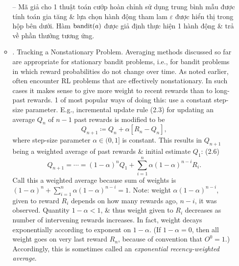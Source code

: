 \documentclass{article}
\begin{document}
\begin{itemize}
\begin{itemize}
        -- Mã giả cho 1 thuật toán cướp hoàn chỉnh sử dụng trung bình mẫu được tính toán gia tăng \& lựa chọn hành động tham lam $\varepsilon$ được hiển thị trong hộp bên dưới. Hàm ${\rm bandit}(a)$ được giả định thực hiện 1 hành động \& trả về phần thưởng tương ứng.
        \item {. Tracking a Nonstationary Problem.} Averaging methods discussed so far are appropriate for stationary bandit problems, i.e., for bandit problems in which reward probabilities do not change over time. As noted earlier, often encounter RL problems that are effectively nonstationary. In such cases it makes sense to give more weight to recent rewards than to long-past rewards. 1 of most popular ways of doing this: use a constant step-size parameter. E.g., incremental update rule (2.3) for updating an average $Q_n$ of $n - 1$ past rewards is modified to be
        \begin{equation*}
            Q_{n+1}\coloneqq Q_n + \alpha[R_n - Q_n],
        \end{equation*}
        where step-size parameter $\alpha\in(0,1]$ is constant. This results in $Q_{n+1}$ being a weighted average of past rewards \& initial estimate $Q_1$: (2.6)
        \begin{equation*}
            Q_{n+1} = \cdots = (1 - \alpha)^nQ_1 + \sum_{i=1}^n \alpha(1 - \alpha)^{n - i}R_i.
        \end{equation*}
        Call this a weighted average because sum of weights is $(1 - \alpha)^n + \sum_{i=1}^n \alpha(1 - \alpha)^{n - i} = 1$. Note: weight $\alpha(1 - \alpha)^{n-i}$, given to reward $R_i$ depends on how many rewards ago, $n - i$, it was observed. Quantity $1 - \alpha < 1$, \& thus weight given to $R_i$ decreases as number of intervening rewards increases. In fact, weight decays exponentially according to exponent on $1 - \alpha$. (If $1 - \alpha = 0$, then all weight goes on very last reward $R_n$, because of convention that $O^0 = 1$.) Accordingly, this is sometimes called an {\it exponential recency-weighted average}.


\end{itemize}
\end{itemize}
\end{document}
